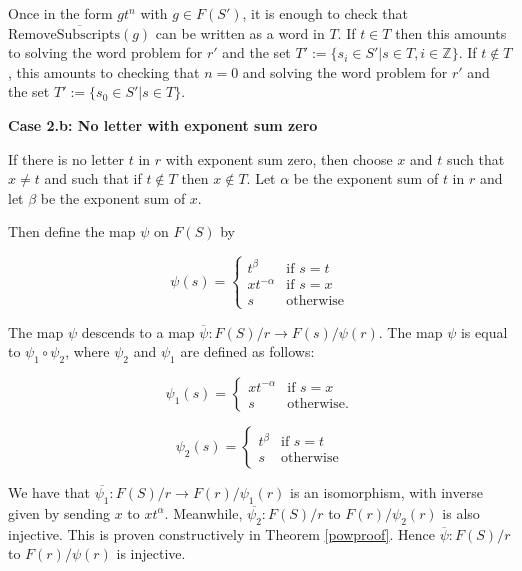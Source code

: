 \documentclass[11pt]{article} %
\theoremstyle{definition}
\theoremstyle{definition}
\theoremstyle{definition}
\theoremstyle{definition}
\theoremstyle{definition}
\theoremstyle{definition}
\begin{document}
Once in the form $g t^n$ with $g \in F(S')$, it is enough to check that
$\overline{\text{RemoveSubscripts}(g)}$ can be written as a word in $T$.
If $t \in T$ then this amounts to solving the word problem for $r'$
and the set $T' := \{ s_i \in S' | s \in T, i \in \mathbb{Z} \}$. If $t \notin T$,
this amounts to checking that $n = 0$ and solving the word problem for
$r'$ and the set $T' := \{s_0 \in S' | s \in T\}$.

\textbf{Case 2.b: No letter with exponent sum zero}\label{noexpsumzero}

If there is no letter $t$ in $r$ with exponent sum zero, then choose $x$
and $t$ such that $x \ne t$ and such that if $t \notin T$ then $x \notin T$.
Let $\alpha$ be the exponent sum
of $t$ in $r$ and let $\beta$ be the exponent sum of $x$.

Then define the map $\psi$ on $F(S)$ by

\begin{equation}
  \psi(s) =
  \begin{cases}
     t^\beta & \text{if }s = t \\
     xt^{-\alpha} &\text{if } s = x \\
     s & \text{otherwise}
  \end{cases}
\end{equation}

The map $\psi$ descends to a map $\overline{\psi}: F(S) / r \to F(s) / \psi(r)$. The map
$\psi$ is equal to $\psi_1 \circ \psi_2$,
where $\psi_2$ and $\psi_1$ are defined as follows:

\begin{equation}
  \psi_1(s) =
  \begin{cases}
     xt^{-\alpha} &\text{if } s = x \\
     s & \text{otherwise.}
  \end{cases}
\end{equation}

\begin{equation}
  \psi_2(s) =
  \begin{cases}
     t^\beta & \text{if } s = t \\
     s & \text{otherwise}
  \end{cases}
\end{equation}

We have that $\overline{\psi_1}: F(S) / r \to F(r) / \psi_1(r)$ is an isomorphism, with inverse given by sending $x$ to $xt^\alpha$. Meanwhile,
$\overline{\psi_2}: F(S) / r$ to $F(r) / \psi_2(r)$
is also injective.
This is proven constructively in Theorem \ref{powproof}.
Hence $\overline{\psi}: F(S) / r$ to $F(r) / \psi(r)$ is injective.
\end{document}
